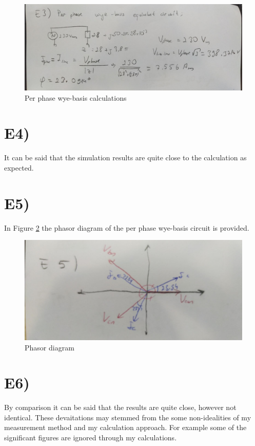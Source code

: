 \documentclass[letterpaper,12pt]{article}
\begin{document}
\begin{figure}[H]
    \centering
    \includegraphics[width = 1\textwidth]{E3.jpeg}
    \caption{Per phase wye-basis calculations }
    \label{E3}
\end{figure}

\section{E4)}
It can be said that the simulation results are quite close to the calculation as expected. 
\section{E5)}
In Figure \ref*{E5} the phasor diagram of the per phase wye-basis circuit is provided.

\begin{figure}[H]
    \centering
    \includegraphics[width = 1\textwidth]{E5.jpeg}
    \caption{Phasor diagram}
    \label{E5}
\end{figure}
\section{E6)}
By comparison it can be said that the results are quite close, however not identical. These devaitations may stemmed from the some non-idealities of my measurement method and my calculation approach. For example some of the significant figures are ignored through my calculations.
\end{document}

